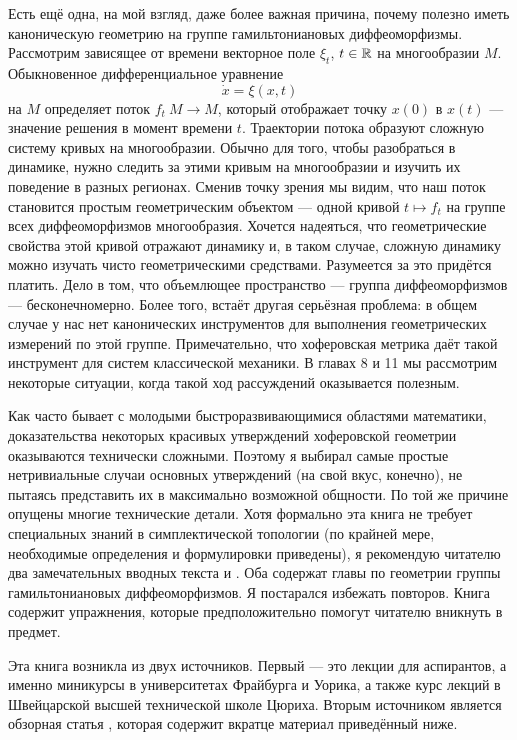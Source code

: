 Есть ещё одна, на мой взгляд, даже более важная причина, почему полезно иметь каноническую геометрию на группе гамильтониановых диффеоморфизмы.
Рассмотрим зависящее от времени векторное поле $\xi_t$, $t\in \mathbb{R}$ на многообразии $M$.
Обыкновенное дифференциальное уравнение
\[\dot x=\xi(x,t)\]
на $M$ определяет поток $f_t\: M \to M$, который отображает точку $x(0)$ в $x(t)$ --- значение решения в момент времени $t$.
Траектории потока образуют сложную систему кривых на многообразии.
Обычно для того, чтобы разобраться в динамике, нужно следить за этими кривым на многообразии и изучить их поведение в разных регионах.
Сменив точку зрения мы видим, что наш поток становится простым
геометрическим объектом --- одной кривой $t \mapsto f_t$ на группе всех диффеоморфизмов многообразия.
Хочется надеяться, что геометрические свойства этой кривой отражают динамику и, в таком случае, сложную динамику можно изучать чисто геометрическими средствами.
Разумеется за это придётся платить.
Дело в том, что объемлющее пространство --- группа
диффеоморфизмов --- бесконечномерно.
Более того, встаёт другая серьёзная проблема:
в общем случае у нас нет канонических инструментов для выполнения геометрических измерений по этой группе.
Примечательно, что хоферовская метрика даёт такой инструмент для систем классической механики.
В главах 8 и 11 мы рассмотрим некоторые ситуации,
когда такой ход рассуждений оказывается полезным.

Как часто бывает с молодыми быстроразвивающимися областями математики, доказательства некоторых красивых утверждений хоферовской геометрии оказываются технически сложными.
Поэтому я выбирал самые простые нетривиальные случаи основных утверждений (на свой вкус, конечно), не пытаясь представить их в максимально возможной общности.
По той же причине опущены многие технические детали.
Хотя формально эта книга не требует специальных знаний в симплектической топологии (по крайней мере, необходимые определения и формулировки приведены), я рекомендую читателю  два замечательных вводных текста \cite{HZ} и \cite{MS}.
Оба содержат главы по геометрии группы гамильтониановых диффеоморфизмов.
Я постарался избежать повторов.
Книга содержит упражнения, которые предположительно помогут читателю вникнуть в предмет.

Эта книга возникла из двух источников.
Первый --- это лекции для аспирантов, а именно миникурсы в университетах Фрайбурга и Уорика, а также курс лекций в Швейцарской высшей технической школе Цюриха.
Вторым источником является обзорная статья \cite{P8}, которая содержит
вкратце материал приведённый ниже.

